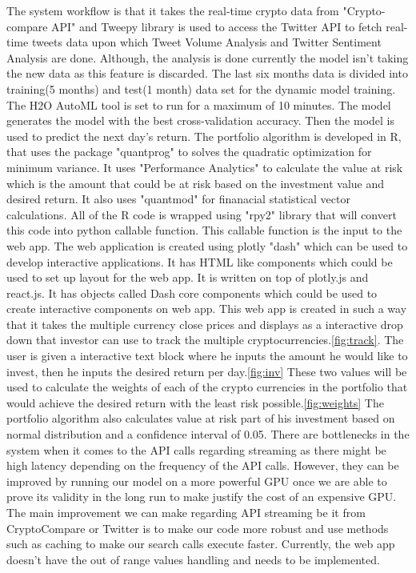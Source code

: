 \documentclass[final]{cvpr}
\begin{document}
The system workflow is that it takes the real-time crypto data from "Crypto-compare API" and Tweepy library is used to access the Twitter API to fetch real-time tweets data upon which Tweet Volume Analysis and Twitter Sentiment Analysis are done. Although, the analysis is done currently the model isn't taking the new data as this feature is discarded. The last six months data is divided into training(5 months) and test(1 month) data set for the dynamic model training. The H2O AutoML tool is set to run for a maximum of 10 minutes. The model generates the model with the best cross-validation accuracy. Then the model is used to predict the next day's return. The portfolio algorithm is developed in R, that uses the package "quantprog" to solves the quadratic optimization for minimum variance. It uses "Performance Analytics" to calculate the value at risk which is the amount that could be at risk based on the investment value and desired return. It also uses "quantmod" for finanacial statistical vector calculations. All of the R code is wrapped using "rpy2" library that will convert this code into python callable function. This callable function is the input to the web app. The web application is created using plotly "dash" which can be used to develop interactive applications. It has HTML like components which could be used to set up layout for the web app. It is written on top of plotly.js and react.js. It has objects called Dash core components which could be used to create interactive components on web app. This web app is created in such a way that it takes the multiple currency close prices and displays as a interactive drop down that investor can use to track the multiple cryptocurrencies.\ref{fig:track}. The user is given a interactive text block where he inputs the amount he would like to invest, then he inputs the desired return per day.\ref{fig:inv} These two values will be used to calculate the weights of each of the crypto currencies in the portfolio that would achieve the desired return with the least risk possible.\ref{fig:weights} The portfolio algorithm also calculates value at risk part of his investment based on normal distribution and a confidence interval of 0.05. There are bottlenecks in the system when it comes to the API calls regarding streaming as there might be high latency depending on the frequency of the API calls.  However, they can be improved by running our model on a more powerful GPU once we are able to prove its validity in the long run to make justify the cost of an expensive GPU. The main improvement we can make regarding API streaming be it from CryptoCompare or Twitter is to make our code more robust and use methods such as caching to make our search calls execute faster. Currently, the web app doesn't have the out of range values handling and needs to be implemented.
\end{document}
